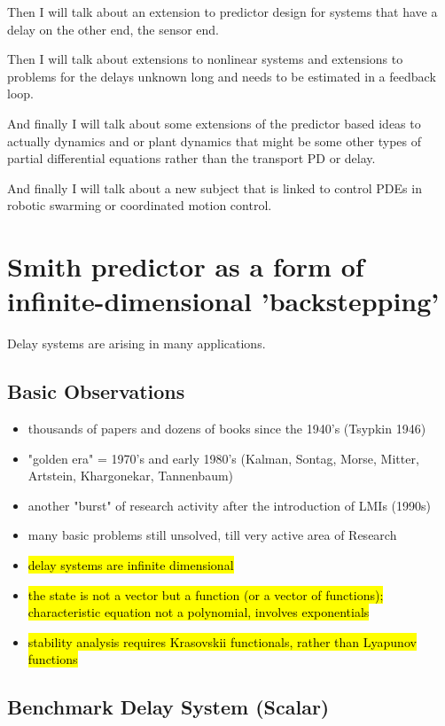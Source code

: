 \documentclass[idxtotoc,hyperref,openany]{labbook} %
\begin{document}
Then I will talk about an extension to predictor design for systems that have a delay on the other end, the sensor end.

Then I will talk about extensions to nonlinear systems and extensions to problems for the delays unknown long and needs to be estimated in a feedback loop.

And finally I will talk about some extensions of the predictor based ideas to actually dynamics and or plant dynamics that might be some other types of partial differential equations rather than the transport PD or delay.

And finally I will talk about a new subject that is linked to control PDEs in robotic swarming or coordinated motion control.

\section{Smith predictor as a form of infinite-dimensional 'backstepping'}

Delay systems are arising in many applications.

\subsection{Basic Observations}

\begin{itemize}
  \item thousands of papers and dozens of books since the 1940's (Tsypkin 1946)
  \item "golden era" = 1970's and early 1980's (Kalman, Sontag, Morse, Mitter, Artstein, Khargonekar, Tannenbaum)
  \item another "burst" of research activity after the introduction of LMIs (1990s)
  \item many basic problems still unsolved, till very active area of Research
  \item \hl{delay systems are infinite dimensional}
  \item \hl{the state is not a vector but a function (or a vector of functions); characteristic equation not a polynomial, involves exponentials}
  \item \hl{stability analysis requires Krasovskii functionals, rather than Lyapunov functions}
\end{itemize}

\subsection{Benchmark Delay System (Scalar)}
\end{document}

